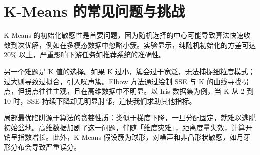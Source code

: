 \chapter{K-Means 的常见问题与挑战}
K-Means 的初始化敏感性是首要问题，因为随机选择的中心可能导致算法快速收敛到次优解，例如在多模态数据中忽略小簇。实验显示，纯随机初始化的方差可达 20\%{} 以上，严重影响下游任务如推荐系统的准确性。\par
另一个难题是 K 值的选择。如果 K 过小，簇会过于宽泛，无法捕捉细粒度模式；过大则导致过拟合，引入噪声簇。Elbow 方法通过绘制 SSE 与 K 的曲线寻找拐点，但拐点往往主观，且在高维数据中不明显。以 Iris 数据集为例，当 K 从 2 到 10 时，SSE 持续下降却无明显肘部，迫使我们求助其他指标。\par
局部最优陷阱源于算法的贪婪性质：类似于梯度下降，一旦分配固定，就难以逃脱初始盆地。高维数据加剧了这一问题，伴随「维度灾难」，距离度量失效，计算开销呈指数增长。此外，K-Means 假设簇为球形，对噪声和非凸形状敏感，如月牙形分布会导致严重误分。\par
